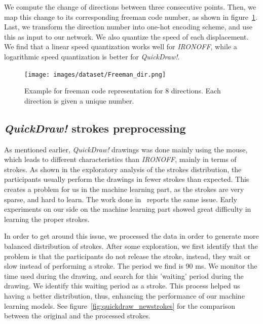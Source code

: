     \par We compute the change of directions between three consecutive points. Then, we map this change to its corresponding freeman code number, as shown in figure~\ref{fig:freeman_dir}. Last, we transform the direction number into one-hot encoding scheme, and use this as input to our network. We also quantize the speed of each displacement. We find that a linear speed quantization works well for \textit{IRONOFF}, while a logarithmic speed quantization is better for \textit{QuickDraw!}.

    \begin{figure}[htbp!]
    \centering
    \texttt{[image: images/dataset/Freeman\_dir.png]}
    \caption{Example for freeman code representation for 8 directions. Each direction is given a unique number.}
    \label{fig:freeman_dir}
    \end{figure}

    \subsection{\textit{QuickDraw!} strokes preprocessing}
    \par As mentioned earlier, \textit{QuickDraw!} drawings was done mainly using the mouse, which leads to different characteristics than \textit{IRONOFF}, mainly in terms of strokes. As shown in the exploratory analysis of the strokes distribution, the participants usually perform the drawings in fewer strokes than expected. This creates a problem for us in the machine learning part, as the strokes are very sparse, and hard to learn. The work done in~\citep{ha2017neural} reports the same issue. Early experiments on our side on the machine learning part showed great difficulty in learning the proper strokes.

    \par In order to get around this issue, we processed the data in order to generate more balanced distribution of strokes. After some exploration, we first identify that the problem is that the participants do not release the stroke, instead, they wait or slow instead of performing a stroke. The period we find is 90 ms. We monitor the time used during the drawing, and search for this 'waiting' period during the drawing. We identify this waiting period as a stroke. This process helped us having a better distribution, thus, enhancing the performance of our machine learning models. See figure~\ref{fig:quickdraw_newstrokes} for the comparison between the original and the processed strokes.

